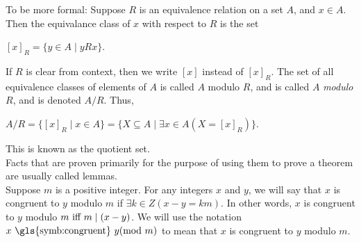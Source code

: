 \documentclass{article}
\begin{document}
\noindent To be more formal: Suppose $R$ is an equivalence relation on a set $A$, and $x \in A$. Then the equivalance class of $x$ with respect to $R$ is the set
\begin{center}
    $[x]_{R} = \{y \in A \mid yRx\}$.
\end{center}
If $R$ is clear from context, then we write $[x]$ instead of $[x]_{R}$. The set of all equivalence classes of elements of $A$ is called $A$ modulo $R$, and is called $A$ \textit{modulo} $R$, and is denoted $A/R$. Thus,
\begin{center}
$A/R = \{[x]_{R} \mid x \in A\} = \{X \subseteq A \mid \exists x \in A(X = [x]_{R})\}$.
\end{center}
This is known as the \gls{quotient set}.\\

\noindent Facts that are proven primarily for the purpose of using them to prove a theorem are usually called \glspl{lemma}.\\

\noindent Suppose $m$ is a positive integer. For any integers $x$ and $y$, we will say that $x$ is \gls{congruent} to $y$ modulo $m$ if $\exists k \in Z(x - y = km)$. In other words, $x$ is congruent to $y$ modulo $m \text{ iff } m \mid (x - y)$. We will use the notation $x \text{ \gls{symb:congruent} } y (\text{mod } m)$ to mean that $x$ is congruent to $y$ modulo $m$.

\clearpage
\printglossary[type=\acronymtype,style=long]  %
\printglossary[type=symbolslist,style=long]   %
\printglossary[type=main]                     %
\end{document}
